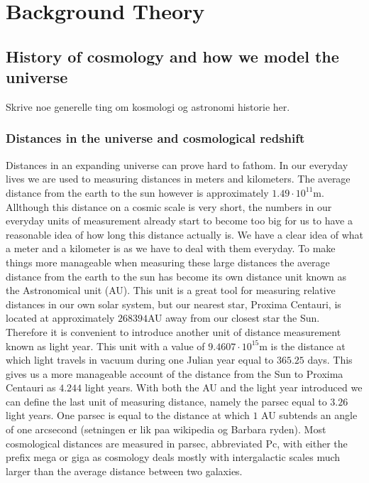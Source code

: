 \chapter{Background Theory}
\section{History of cosmology and how we model the universe}
Skrive noe generelle ting om kosmologi og astronomi historie her.
\subsection{Distances in the universe and cosmological redshift}
Distances in an expanding universe can prove hard to fathom. In our everyday
lives we are used to measuring distances in meters and kilometers. The
average distance from the earth to the sun however is approximately $1.49\cdot10^{11}$m.
Allthough this distance on a cosmic scale is very short, the numbers in our
everyday units of measurement already start to become too big for us to have a
reasonable idea of how long this distance actually is. We have a clear idea of
what a meter and a kilometer is as we have to deal with them everyday. To make
things more manageable when measuring these large distances the average distance
from the earth to the sun has become its own distance unit known as the
Astronomical unit (AU). This unit is a great tool for measuring relative
distances in our own solar system, but our nearest star, Proxima Centauri, is
located at approximately $268394$AU away from our closest star the Sun.
Therefore it is convenient to introduce another unit of distance measurement known as light year. This unit with a value of $9.4607\cdot10^{15}$m is the distance at
which light travels in vacuum during one Julian year equal to $365.25$ days.
This gives us a more manageable account of the distance from the Sun to Proxima
Centauri as $4.244$ light years. With both the AU and the light year introduced
we can define the last unit of measuring distance, namely the parsec equal to $3.26$
light years. One parsec is equal to the distance at which $1$ AU subtends an angle
of one arcsecond (setningen er lik paa wikipedia og Barbara ryden). Most
cosmological distances are measured in parsec, abbreviated Pc, with either the
prefix mega or giga as cosmology deals mostly with intergalactic scales much
larger than the average distance between two galaxies.\\

